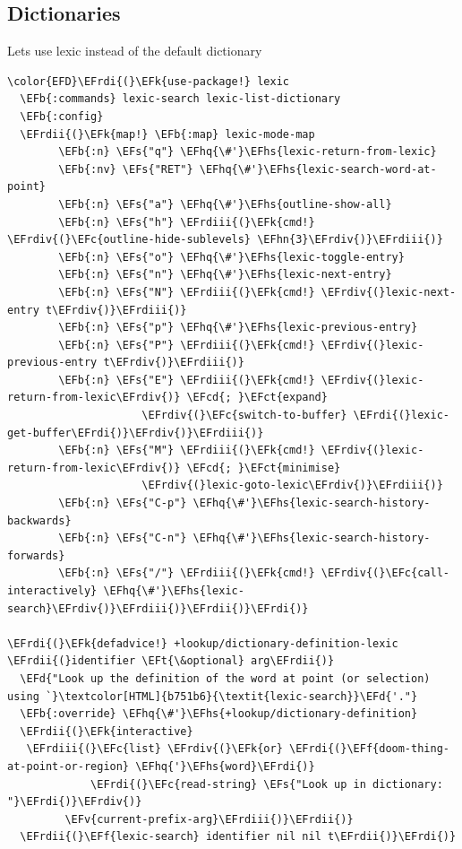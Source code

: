 \documentclass{scrartcl}
\newcommand{\EFk}[1]{\textcolor{EFk}{#1}} %
\newcommand{\EFd}[1]{\textcolor{EFd}{\textit{#1}}} %
\newcommand{\EFt}[1]{\textcolor{EFt}{#1}} %
\newcommand{\EFs}[1]{\textcolor{EFs}{#1}} %
\newcommand{\EFb}[1]{\textcolor{EFb}{#1}} %
\newcommand{\EFct}[1]{\textcolor{EFct}{#1}} %
\newcommand{\EFc}[1]{\textcolor{EFc}{#1}} %
\newcommand{\EFv}[1]{\textcolor{EFv}{#1}} %
\newcommand{\EFf}[1]{\textcolor{EFf}{#1}} %
\newcommand{\EFcd}[1]{\textcolor{EFcd}{#1}} %
\newcommand{\EFhn}[1]{\textcolor{EFhn}{\textbf{#1}}} %
\newcommand{\EFhq}[1]{\textcolor{EFhq}{#1}} %
\newcommand{\EFhs}[1]{\textcolor{EFhs}{#1}} %
\newcommand{\EFrdi}[1]{\textcolor{EFrdi}{#1}} %
\newcommand{\EFrdii}[1]{\textcolor{EFrdii}{#1}} %
\newcommand{\EFrdiii}[1]{\textcolor{EFrdiii}{#1}} %
\newcommand{\EFrdiv}[1]{\textcolor{EFrdiv}{#1}} %
\begin{document}
\subsection{Dictionaries}
\label{sec:orgc6aecd3}
Lets use lexic instead of the default dictionary
\begin{Code}
\begin{Verbatim}[]
\color{EFD}\EFrdi{(}\EFk{use-package!} lexic
  \EFb{:commands} lexic-search lexic-list-dictionary
  \EFb{:config}
  \EFrdii{(}\EFk{map!} \EFb{:map} lexic-mode-map
        \EFb{:n} \EFs{"q"} \EFhq{\#'}\EFhs{lexic-return-from-lexic}
        \EFb{:nv} \EFs{"RET"} \EFhq{\#'}\EFhs{lexic-search-word-at-point}
        \EFb{:n} \EFs{"a"} \EFhq{\#'}\EFhs{outline-show-all}
        \EFb{:n} \EFs{"h"} \EFrdiii{(}\EFk{cmd!} \EFrdiv{(}\EFc{outline-hide-sublevels} \EFhn{3}\EFrdiv{)}\EFrdiii{)}
        \EFb{:n} \EFs{"o"} \EFhq{\#'}\EFhs{lexic-toggle-entry}
        \EFb{:n} \EFs{"n"} \EFhq{\#'}\EFhs{lexic-next-entry}
        \EFb{:n} \EFs{"N"} \EFrdiii{(}\EFk{cmd!} \EFrdiv{(}lexic-next-entry t\EFrdiv{)}\EFrdiii{)}
        \EFb{:n} \EFs{"p"} \EFhq{\#'}\EFhs{lexic-previous-entry}
        \EFb{:n} \EFs{"P"} \EFrdiii{(}\EFk{cmd!} \EFrdiv{(}lexic-previous-entry t\EFrdiv{)}\EFrdiii{)}
        \EFb{:n} \EFs{"E"} \EFrdiii{(}\EFk{cmd!} \EFrdiv{(}lexic-return-from-lexic\EFrdiv{)} \EFcd{; }\EFct{expand}
                     \EFrdiv{(}\EFc{switch-to-buffer} \EFrdi{(}lexic-get-buffer\EFrdi{)}\EFrdiv{)}\EFrdiii{)}
        \EFb{:n} \EFs{"M"} \EFrdiii{(}\EFk{cmd!} \EFrdiv{(}lexic-return-from-lexic\EFrdiv{)} \EFcd{; }\EFct{minimise}
                     \EFrdiv{(}lexic-goto-lexic\EFrdiv{)}\EFrdiii{)}
        \EFb{:n} \EFs{"C-p"} \EFhq{\#'}\EFhs{lexic-search-history-backwards}
        \EFb{:n} \EFs{"C-n"} \EFhq{\#'}\EFhs{lexic-search-history-forwards}
        \EFb{:n} \EFs{"/"} \EFrdiii{(}\EFk{cmd!} \EFrdiv{(}\EFc{call-interactively} \EFhq{\#'}\EFhs{lexic-search}\EFrdiv{)}\EFrdiii{)}\EFrdii{)}\EFrdi{)}

\EFrdi{(}\EFk{defadvice!} +lookup/dictionary-definition-lexic \EFrdii{(}identifier \EFt{\&optional} arg\EFrdii{)}
  \EFd{"Look up the definition of the word at point (or selection) using `}\textcolor[HTML]{b751b6}{\textit{lexic-search}}\EFd{'."}
  \EFb{:override} \EFhq{\#'}\EFhs{+lookup/dictionary-definition}
  \EFrdii{(}\EFk{interactive}
   \EFrdiii{(}\EFc{list} \EFrdiv{(}\EFk{or} \EFrdi{(}\EFf{doom-thing-at-point-or-region} \EFhq{'}\EFhs{word}\EFrdi{)}
             \EFrdi{(}\EFc{read-string} \EFs{"Look up in dictionary: "}\EFrdi{)}\EFrdiv{)}
         \EFv{current-prefix-arg}\EFrdiii{)}\EFrdii{)}
  \EFrdii{(}\EFf{lexic-search} identifier nil nil t\EFrdii{)}\EFrdi{)}
\end{Verbatim}
\end{Code}
\end{document}
